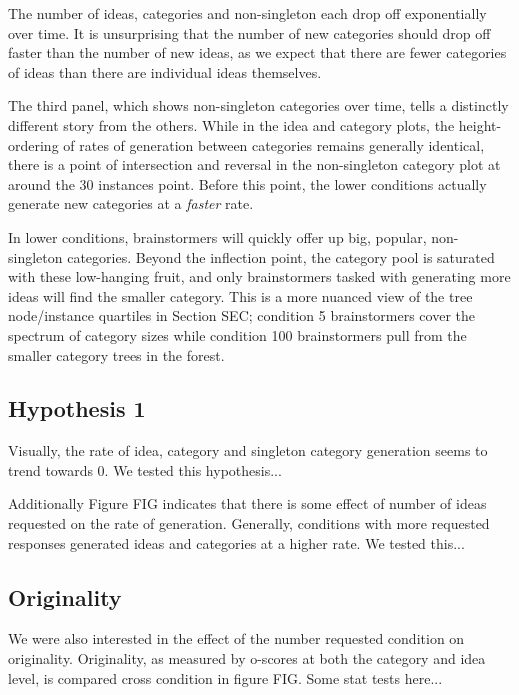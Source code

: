 The number of ideas, categories and non-singleton each drop off exponentially over time. It is unsurprising that the number of new categories should drop off faster than the number of new ideas, as we expect that there are fewer categories of ideas than there are individual ideas themselves.

The third panel, which shows non-singleton categories over time, tells a distinctly different story from the others. While in the idea and category plots, the height-ordering of rates of generation between categories remains generally identical, there is a point of intersection and reversal in the non-singleton category plot at around the 30 instances point. Before this point, the lower conditions actually generate new categories at a \emph{faster} rate.

In lower conditions, brainstormers will quickly offer up big, popular, non-singleton categories. Beyond the inflection point, the category pool is saturated with these low-hanging fruit, and only brainstormers tasked with generating more ideas will find the smaller category. This is a more nuanced view of the tree node/instance quartiles in Section SEC; condition 5 brainstormers cover the spectrum of category sizes while condition 100 brainstormers pull from the smaller category trees in the forest.

\subsection{Hypothesis 1}

Visually, the rate of idea, category and singleton category generation seems to trend towards 0. We tested this hypothesis...

Additionally Figure FIG indicates that there is some effect of number of ideas requested on the rate of generation. Generally, conditions with more requested responses generated ideas and categories at a higher rate. We tested this...

\subsection{Originality}

We were also interested in the effect of the number requested condition on originality. Originality, as measured by o-scores at both the category and idea level, is compared cross condition in figure FIG. Some stat tests here...


